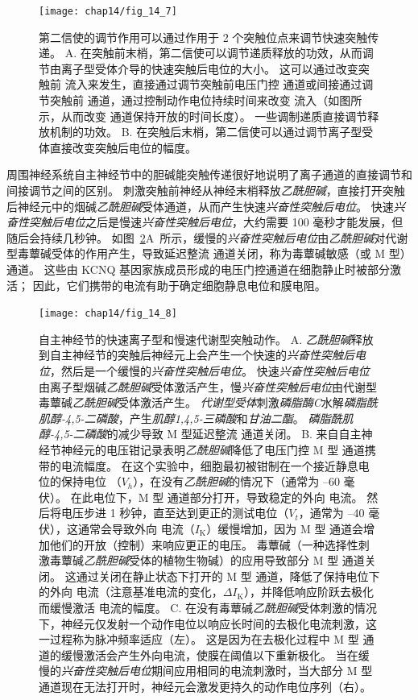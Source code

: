 \begin{figure}[htbp]
	\centering
	\texttt{[image: chap14/fig\_14\_7]}
	\caption{第二信使的调节作用可以通过作用于 2 个突触位点来调节快速突触传递。
		A. 在突触前末梢，第二信使可以调节递质释放的功效，从而调节由离子型受体介导的快速突触后电位的大小。
		这可以通过改变突触前  流入来发生，直接通过调节突触前电压门控  通道或间接通过调节突触前  通道，通过控制动作电位持续时间来改变  流入（如图所示，从而改变  通道保持开放的时间长度）。
		一些调制递质直接调节释放机制的功效。
		B. 在突触后末梢，第二信使可以通过调节离子型受体直接改变突触后电位的幅度。}
	\label{fig:14_7}
\end{figure}


周围神经系统自主神经节中的胆碱能突触传递很好地说明了离子通道的直接调节和间接调节之间的区别。
刺激突触前神经从神经末梢释放\textit{乙酰胆碱}，直接打开突触后神经元中的烟碱\textit{乙酰胆碱}受体通道，从而产生快速\textit{兴奋性突触后电位}。
快速\textit{兴奋性突触后电位}之后是慢速\textit{兴奋性突触后电位}，大约需要 100 毫秒才能发展，但随后会持续几秒钟。
如图~\ref{fig:14_8}A~所示，缓慢的\textit{兴奋性突触后电位}由\textit{乙酰胆碱}对代谢型毒蕈碱受体的作用产生，导致延迟整流  通道关闭，称为毒蕈碱敏感（或 M 型） 通道。
这些由 KCNQ 基因家族成员形成的电压门控通道在细胞静止时被部分激活；
因此，它们携带的电流有助于确定细胞静息电位和膜电阻。


\begin{figure}[htbp]
	\centering
	\texttt{[image: chap14/fig\_14\_8]}
	\caption{自主神经节的快速离子型和慢速代谢型突触动作。
		A. \textit{乙酰胆碱}释放到自主神经节的突触后神经元上会产生一个快速的\textit{兴奋性突触后电位}，然后是一个缓慢的\textit{兴奋性突触后电位}。
		快速\textit{兴奋性突触后电位}由离子型烟碱\textit{乙酰胆碱}受体激活产生，慢\textit{兴奋性突触后电位}由代谢型毒蕈碱\textit{乙酰胆碱}受体激活产生。
		\textit{代谢型受体}刺激\textit{磷脂酶C}水解\textit{磷脂酰肌醇-4,5-二磷酸}，产生\textit{肌醇1,4,5-三磷酸}和\textit{甘油二酯}。
		\textit{磷脂酰肌醇-4,5-二磷酸}的减少导致 M 型延迟整流  通道关闭。
		B. 来自自主神经节神经元的电压钳记录表明\textit{乙酰胆碱}降低了电压门控 M 型  通道携带的电流幅度。
		在这个实验中，细胞最初被钳制在一个接近静息电位的保持电位 （$V_h$），在没有\textit{乙酰胆碱}的情况下（通常为 –60 毫伏）。
		在此电位下，M 型  通道部分打开，导致稳定的外向  电流。
		然后将电压步进 1 秒钟，直至达到更正的测试电位（$V_t$，通常为 –40 毫伏），这通常会导致外向  电流（$I_\text{K}$）缓慢增加，因为 M 型  通道会增加他们的开放（控制）来响应更正的电压。
		毒蕈碱（一种选择性刺激毒蕈碱\textit{乙酰胆碱}受体的植物生物碱）的应用导致部分 M 型  通道关闭。
		这通过关闭在静止状态下打开的 M 型  通道，降低了保持电位下的外向  电流（注意基准电流的变化，$\Delta I_\text{K}$），并降低响应阶跃去极化而缓慢激活  电流的幅度\cite{adams1986slow}。
		C. 在没有毒蕈碱\textit{乙酰胆碱}受体刺激的情况下，神经元仅发射一个动作电位以响应长时间的去极化电流刺激，这一过程称为脉冲频率适应（左）。
		这是因为在去极化过程中 M 型  通道的缓慢激活会产生外向电流，使膜在阈值以下重新极化。
		当在缓慢的\textit{兴奋性突触后电位}期间应用相同的电流刺激时，当大部分 M 型通道现在无法打开时，神经元会激发更持久的动作电位序列（右）\cite{adams1986slow}。}
	\label{fig:14_8}
\end{figure}


